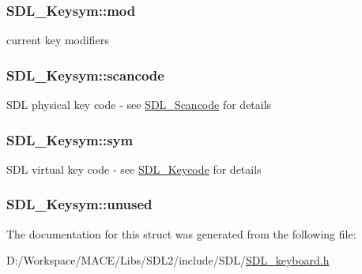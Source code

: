 \subsubsection[{\texorpdfstring{mod}{mod}}]{ S\+D\+L\+\_\+\+Keysym\+::mod}\hypertarget{struct_s_d_l___keysym_ab519d1b8a9939d3d035f7103f3208291}{}\label{struct_s_d_l___keysym_ab519d1b8a9939d3d035f7103f3208291}
current key modifiers 
\subsubsection[{\texorpdfstring{scancode}{scancode}}]{ S\+D\+L\+\_\+\+Keysym\+::scancode}\hypertarget{struct_s_d_l___keysym_ad47e9120a511e2efc7ec0c6d8a5ec51e}{}\label{struct_s_d_l___keysym_ad47e9120a511e2efc7ec0c6d8a5ec51e}
S\+DL physical key code -\/ see \hyperlink{_s_d_l__scancode_8h_a82ab7cff701034fb40a47b5b3a02777b}{S\+D\+L\+\_\+\+Scancode} for details 
\subsubsection[{\texorpdfstring{sym}{sym}}]{ S\+D\+L\+\_\+\+Keysym\+::sym}\hypertarget{struct_s_d_l___keysym_a082ff1fd787b79fa6c3a445deb225f08}{}\label{struct_s_d_l___keysym_a082ff1fd787b79fa6c3a445deb225f08}
S\+DL virtual key code -\/ see \hyperlink{_s_d_l__keycode_8h_ae9265f064f13f0f74dfca26a67875171}{S\+D\+L\+\_\+\+Keycode} for details 
\subsubsection[{\texorpdfstring{unused}{unused}}]{ S\+D\+L\+\_\+\+Keysym\+::unused}\hypertarget{struct_s_d_l___keysym_ab1d0a50cc619966fb06b92e15cc46dd9}{}\label{struct_s_d_l___keysym_ab1d0a50cc619966fb06b92e15cc46dd9}


The documentation for this struct was generated from the following file\+:\begin{DoxyCompactItemize}
\item 
D\+:/\+Workspace/\+M\+A\+C\+E/\+Libs/\+S\+D\+L2/include/\+S\+D\+L/\hyperlink{_s_d_l__keyboard_8h}{S\+D\+L\+\_\+keyboard.\+h}\end{DoxyCompactItemize}
